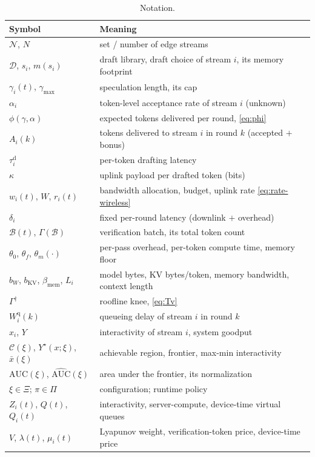 \documentclass[11pt]{article}
\theoremstyle{definition}
\theoremstyle{remark}
\newcommand{\cN}{\mathcal{N}}
\newcommand{\cB}{\mathcal{B}}
\newcommand{\cC}{\mathcal{C}}
\newcommand{\cD}{\mathcal{D}}
\newcommand{\auc}{\mathrm{AUC}}
\newcommand{\nauc}{\widehat{\mathrm{AUC}}}
\begin{document}
\begin{table}[t]
\centering
\caption{Notation.}
\label{tab:notation}
\small
\begin{tabular}{@{}ll@{}}
\toprule
Symbol & Meaning \\
\midrule
$\cN$, $N$ & set / number of edge streams \\
$\cD$, $s_i$, $m(s_i)$ & draft library, draft choice of stream $i$, its memory footprint \\
$\gamma_i(t)$, $\gamma_{\max}$ & speculation length, its cap \\
$\alpha_i$ & token-level acceptance rate of stream $i$ (unknown) \\
$\phi(\gamma,\alpha)$ & expected tokens delivered per round, \eqref{eq:phi} \\
$A_i(k)$ & tokens delivered to stream $i$ in round $k$ (accepted $+$ bonus) \\
$\tau_i^{\mathrm{d}}$ & per-token drafting latency \\
$\kappa$ & uplink payload per drafted token (bits) \\
$w_i(t)$, $W$, $r_i(t)$ & bandwidth allocation, budget, uplink rate \eqref{eq:rate-wireless} \\
$\delta_i$ & fixed per-round latency (downlink $+$ overhead) \\
$\cB(t)$, $\Gamma(\cB)$ & verification batch, its total token count \\
$\theta_0$, $\theta_f$, $\theta_m(\cdot)$ & per-pass overhead, per-token compute time, memory floor \\
$b_W$, $b_{\mathrm{KV}}$, $\beta_{\mathrm{mem}}$, $L_i$ & model bytes, KV bytes/token, memory bandwidth, context length \\
$\Gamma^{\dagger}$ & roofline knee, \eqref{eq:Tv} \\
$W_i^{\mathrm{q}}(k)$ & queueing delay of stream $i$ in round $k$ \\
$x_i$, $Y$ & interactivity of stream $i$, system goodput \\
$\cC(\xi)$, $Y^{\star}(x;\xi)$, $\bar{x}(\xi)$ & achievable region, frontier, max-min interactivity \\
$\auc(\xi)$, $\nauc(\xi)$ & area under the frontier, its normalization \\
$\xi\in\Xi$; $\pi\in\Pi$ & configuration; runtime policy \\
$Z_i(t)$, $Q(t)$, $Q_i(t)$ & interactivity, server-compute, device-time virtual queues \\
$V$, $\lambda(t)$, $\mu_i(t)$ & Lyapunov weight, verification-token price, device-time price \\
\bottomrule
\end{tabular}
\end{table}
\end{document}
